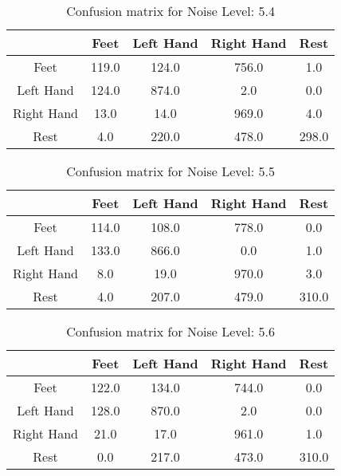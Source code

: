 \begin{table}[!htbp]
    \centering
    \begin{tabular}{|c||c|c|c|c|}
        \hline
		 & Feet & Left Hand & Right Hand & Rest \\
        \hline
        \hline
        Feet & 119.0 & 124.0 & 756.0 & 1.0 \\
        \hline
        Left Hand & 124.0 & 874.0 & 2.0 & 0.0 \\
        \hline
        Right Hand & 13.0 & 14.0 & 969.0 & 4.0 \\
        \hline
        Rest & 4.0 & 220.0 & 478.0 & 298.0 \\
        \hline
    \end{tabular}
    \caption{Confusion matrix for Noise Level: 5.4}
\end{table}

\begin{table}[!htbp]
    \centering
    \begin{tabular}{|c||c|c|c|c|}
        \hline
		 & Feet & Left Hand & Right Hand & Rest \\
        \hline
        \hline
        Feet & 114.0 & 108.0 & 778.0 & 0.0 \\
        \hline
        Left Hand & 133.0 & 866.0 & 0.0 & 1.0 \\
        \hline
        Right Hand & 8.0 & 19.0 & 970.0 & 3.0 \\
        \hline
        Rest & 4.0 & 207.0 & 479.0 & 310.0 \\
        \hline
    \end{tabular}
    \caption{Confusion matrix for Noise Level: 5.5}
\end{table}

\begin{table}[!htbp]
    \centering
    \begin{tabular}{|c||c|c|c|c|}
        \hline
		 & Feet & Left Hand & Right Hand & Rest \\
        \hline
        \hline
        Feet & 122.0 & 134.0 & 744.0 & 0.0 \\
        \hline
        Left Hand & 128.0 & 870.0 & 2.0 & 0.0 \\
        \hline
        Right Hand & 21.0 & 17.0 & 961.0 & 1.0 \\
        \hline
        Rest & 0.0 & 217.0 & 473.0 & 310.0 \\
        \hline
    \end{tabular}
    \caption{Confusion matrix for Noise Level: 5.6}
\end{table}

